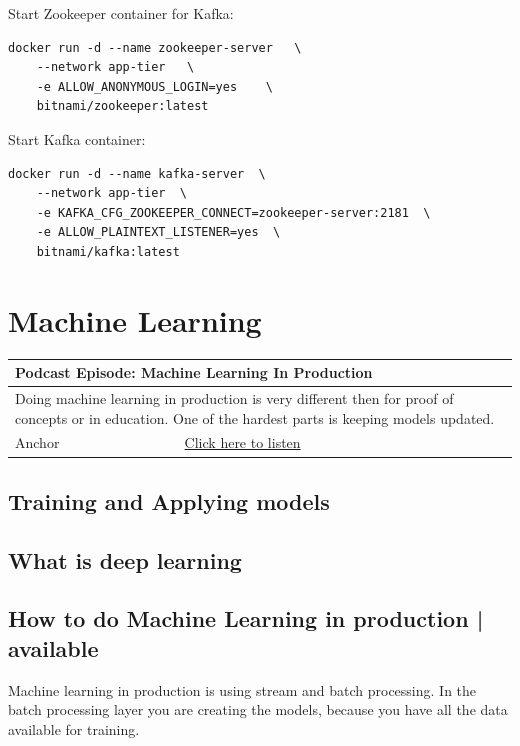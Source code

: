 \documentclass[12pt, numbers=noenddot]{scrreprt} %
\begin{document}
Start Zookeeper container for Kafka:

\begin{lstlisting}
docker run -d --name zookeeper-server   \
	--network app-tier   \
	-e ALLOW_ANONYMOUS_LOGIN=yes    \
	bitnami/zookeeper:latest
\end{lstlisting}

Start Kafka container:

\begin{lstlisting}
docker run -d --name kafka-server  \
	--network app-tier  \
	-e KAFKA_CFG_ZOOKEEPER_CONNECT=zookeeper-server:2181  \
	-e ALLOW_PLAINTEXT_LISTENER=yes  \
	bitnami/kafka:latest
\end{lstlisting}


\chapter{Machine Learning}

\begin{table}[h]
\begin{tabular}{ll}
\hline
\multicolumn{2}{l}{\textbf{Podcast Episode:} Machine Learning In Production} \\ \hline
\multicolumn{2}{p{15cm}}{Doing machine learning in production is very different then for proof of concepts or in education. One of the hardest parts is keeping models updated.}         \\ \hline
\multicolumn{1}{l|}{Anchor}   & \href{https://anchor.fm/andreaskayy/episodes/Machine-Learning-In-Production-e11bbk}{Click here to listen}   \\  \hline
\end{tabular}
\end{table}


\section{Training and Applying models}
\section{What is deep learning}
\section{How to do Machine Learning in production | available}
Machine learning in production is using stream and batch processing. In the batch processing layer you are creating the models, because you have all the data available for training.
\end{document}
